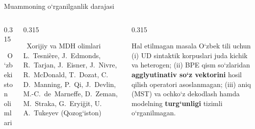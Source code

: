\documentclass[aspectratio=169,11pt]{beamer}
\begin{document}
\begin{frame}{Muammoning o‘rganilganlik darajasi}
\begin{columns}[T,onlytextwidth]
\begin{column}{0.315\textwidth}
\begin{block}{\faUniversity\ O‘zbekiston olimlari}
    \end{block}
  \end{column}
  \begin{column}{0.315\textwidth}
    \begin{block}{\faGlobe\ Xorijiy va MDH olimlari}
      \scriptsize L.~Tesnière, J.~Edmonds, R.~Tarjan, J.~Eisner, J.~Nivre, R.~McDonald, T.~Dozat, C.\,D.~Manning, P.~Qi, J.~Devlin, M.-C.~de~Marneffe, D.~Zeman, M.~Straka, G.~Eryiğit, U.\,A.~Tukeyev (Qozog‘iston)
    \end{block}
  \end{column}
  \begin{column}{0.315\textwidth}
    \begin{alertblock}{Hal etilmagan masala}
      \scriptsize O‘zbek tili uchun (i) UD sintaktik korpuslari juda kichik va heterogen; (ii) BPE qism so‘zlaridan \textbf{agglyutinativ so‘z vektorini} hosil qilish operatori asoslanmagan; (iii) aniq (MST) va ochko‘z dekodlash hamda modelning \textbf{turg‘unligi} tizimli o‘rganilmagan.
    \end{alertblock}
  \end{column}
  \end{columns}
\end{frame}
\end{document}
